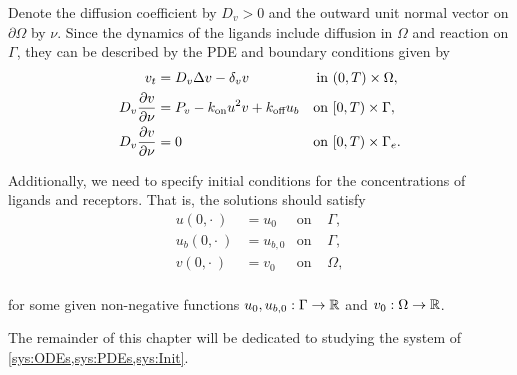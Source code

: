 Denote the diffusion coefficient by $D_v > 0$ and the outward unit normal vector on $\partial \Omega$ by $\nu$. Since the dynamics of the ligands include diffusion in $\Omega$ and reaction on $\Gamma$, they can be described by the PDE and boundary conditions given by
%
\begin{equation}
    \label{sys:PDEs}
    \begin{aligned}
        v_t                   &= D_v \Delta v - \delta_v v      & \text{in }& (0, T) \times \Omega, \\
        D_v \pderiv[v]{\nu}   &= P_v - \kon u^2 v + \koff u_b   & \text{on }& [0, T) \times \Gamma, \\
        D_v \pderiv[v]{\nu}   &= 0                              & \text{on }& [0, T) \times \Gamma_e. \\
    \end{aligned}
\end{equation}

\noindent
Additionally, we need to specify initial conditions for the concentrations of ligands and receptors. That is, the solutions should satisfy
%
\begin{equation}
    \label{sys:Init}
    \begin{aligned}
        u(0, \cdot\ )          &= u_0           & \text{on }& \Gamma, \\
        u_b(0, \cdot\ )        &= u_{b,0}       & \text{on }& \Gamma, \\
        v(0, \cdot\ )          &= v_0           & \text{on }& \Omega, \\
    \end{aligned}
\end{equation}

\noindent
for some given non-negative functions $u_0, u_{b,0}: \Gamma \to \R$ and $v_0: \Omega \to \R$.

The remainder of this chapter will be dedicated to studying the system of \cref{sys:ODEs,sys:PDEs,sys:Init}.